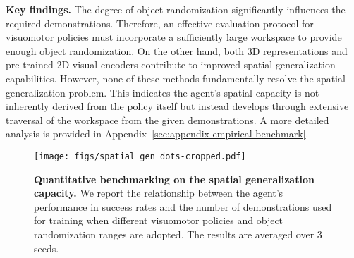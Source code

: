 \vspace{0.2cm} \noindent\textbf{Key findings.}
The degree of object randomization significantly influences the required demonstrations. Therefore, an effective evaluation protocol for visuomotor policies must incorporate a sufficiently large workspace to provide enough object randomization. On the other hand, both 3D representations and pre-trained 2D visual encoders contribute to improved spatial generalization capabilities. However, none of these methods fundamentally resolve the spatial generalization problem. This indicates the agent’s spatial capacity is not inherently derived from the policy itself but instead develops through extensive traversal of the workspace from the given demonstrations. A more detailed analysis is provided in Appendix~\ref{sec:appendix-empirical-benchmark}.


\begin{figure}[t]
    \texttt{[image: figs/spatial\_gen\_dots-cropped.pdf]}
    \caption{\textbf{Quantitative benchmarking on the spatial generalization capacity.} We report the relationship between the agent's performance in success rates and the number of demonstrations used for training when different visuomotor policies and object randomization ranges are adopted. The results are averaged over $3$ seeds.}
    \label{fig:spatial_gen_benchmark}
\end{figure}
